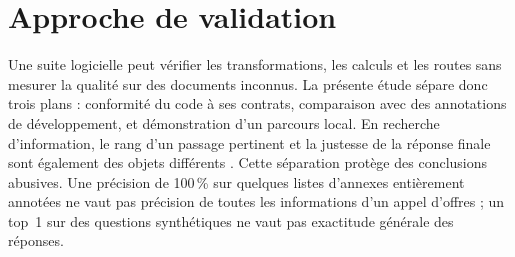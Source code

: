 \section{Approche de validation}
Une suite logicielle peut vérifier les transformations, les calculs et les routes sans mesurer la qualité sur des documents inconnus. La présente étude sépare donc trois plans : conformité du code à ses contrats, comparaison avec des annotations de développement, et démonstration d'un parcours local. En recherche d'information, le rang d'un passage pertinent et la justesse de la réponse finale sont également des objets différents \cite{irbook}. Cette séparation protège des conclusions abusives. Une précision de 100\,\% sur quelques listes d'annexes entièrement annotées ne vaut pas précision de toutes les informations d'un appel d'offres ; un top~1 sur des questions synthétiques ne vaut pas exactitude générale des réponses.
